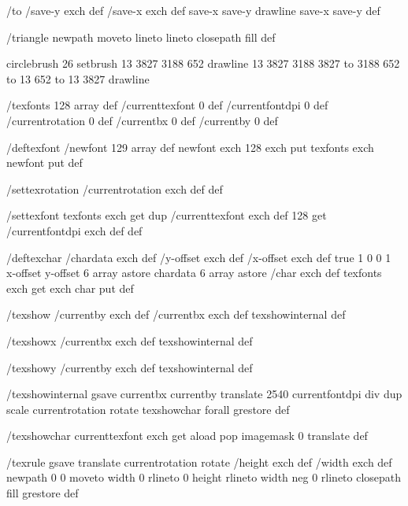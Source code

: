 /to
 { /save-y exch def
   /save-x exch def
   save-x save-y drawline
   save-x save-y } def

/triangle
 { newpath moveto lineto lineto closepath fill } def

circlebrush 26 setbrush
13 3827 3188 652 drawline
13 3827 3188 3827 to 3188 652 to 13 652 to 13 3827 drawline



/texfonts 128 array def
/currenttexfont 0 def
/currentfontdpi 0 def
/currentrotation 0 def
/currentbx 0 def
/currentby 0 def

/deftexfont
 { /newfont 129 array def
   newfont exch 128 exch put
   texfonts exch newfont put } def

/settexrotation
 { /currentrotation exch def } def

/settexfont
 { texfonts exch get dup /currenttexfont exch def
   128 get /currentfontdpi exch def } def

/deftexchar
 { /chardata exch def
   /y-offset exch def
   /x-offset exch def
   true
   1 0 0 1 x-offset y-offset 6 array astore
   chardata
   6 array astore /char exch def
   texfonts exch get exch char put } def

/texshow
 { /currentby exch def
   /currentbx exch def
   texshowinternal } def

/texshowx
 { /currentbx exch def
   texshowinternal } def

/texshowy
 { /currentby exch def
   texshowinternal } def

/texshowinternal
 { gsave
   currentbx currentby translate
   2540 currentfontdpi div dup scale
   currentrotation rotate
   {texshowchar} forall
   grestore } def

/texshowchar
   { currenttexfont exch get aload pop imagemask 0 translate } def

/texrule
 { gsave
   translate
   currentrotation rotate
   /height exch def
   /width exch def
   newpath
    0 0 moveto
    width 0 rlineto
    0 height rlineto
    width neg 0 rlineto
    closepath
    fill
   grestore } def

